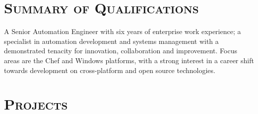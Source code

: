 \documentclass[11pt,letter,roman]{moderncv}
\begin{document}
\makecvtitle{}

\section{\textsc{Summary of Qualifications}}
A Senior Automation Engineer with six years of enterprise work experience; a
specialist in automation development and systems management with a demonstrated
tenacity for innovation, collaboration and improvement. Focus areas are the
Chef and Windows platforms, with a strong interest in a career shift towards
development on cross-platform and open source technologies.

\section{\textsc{Projects}}
\end{document}
